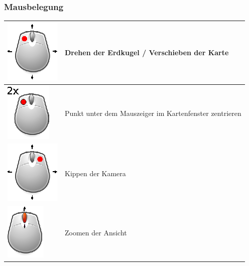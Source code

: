 \documentclass[10pt]{scrreprt}
\begin{document}
\subsubsection*{Mausbelegung}
\begin{tabular}{|>{\centering \arraybackslash}m{3cm}|m{10cm}|}
\hline
\includegraphics[scale=1.0]{images/mouseDrag_left.eps} & Drehen der Erdkugel / Verschieben der Karte \\ 
\hline 
\includegraphics[scale=1.0]{images/mouseDoubleClick_left.eps} & Punkt unter dem Mauszeiger im Kartenfenster zentrieren \\
\hline
\includegraphics[scale=1.0]{images/mouseDrag_right.eps} & Kippen der Kamera \\
\hline
\includegraphics[scale=1.0]{images/mouse_scrollen.eps} & Zoomen der Ansicht \\
\hline
\end{tabular} 


\vspace{3mm}
\end{document}
